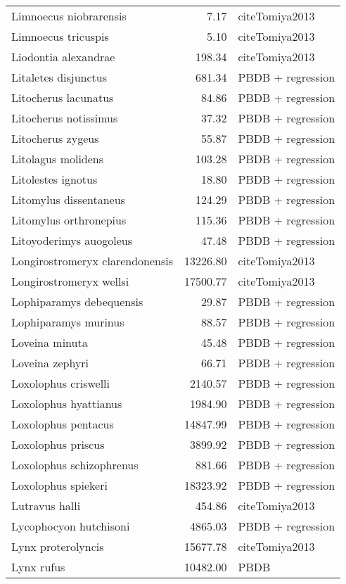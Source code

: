 \begin{table}[ht]
\begin{tabular}{lrl}
  Limnoecus niobrarensis & 7.17 & cite{Tomiya2013} \\ 
  Limnoecus tricuspis & 5.10 & cite{Tomiya2013} \\ 
  Liodontia alexandrae & 198.34 & cite{Tomiya2013} \\ 
  Litaletes disjunctus & 681.34 & PBDB + regression \\ 
  Litocherus lacunatus & 84.86 & PBDB + regression \\ 
  Litocherus notissimus & 37.32 & PBDB + regression \\ 
  Litocherus zygeus & 55.87 & PBDB + regression \\ 
  Litolagus molidens & 103.28 & PBDB + regression \\ 
  Litolestes ignotus & 18.80 & PBDB + regression \\ 
  Litomylus dissentaneus & 124.29 & PBDB + regression \\ 
  Litomylus orthronepius & 115.36 & PBDB + regression \\ 
  Litoyoderimys auogoleus & 47.48 & PBDB + regression \\ 
  Longirostromeryx clarendonensis & 13226.80 & cite{Tomiya2013} \\ 
  Longirostromeryx wellsi & 17500.77 & cite{Tomiya2013} \\ 
  Lophiparamys debequensis & 29.87 & PBDB + regression \\ 
  Lophiparamys murinus & 88.57 & PBDB + regression \\ 
  Loveina minuta & 45.48 & PBDB + regression \\ 
  Loveina zephyri & 66.71 & PBDB + regression \\ 
  Loxolophus criswelli & 2140.57 & PBDB + regression \\ 
  Loxolophus hyattianus & 1984.90 & PBDB + regression \\ 
  Loxolophus pentacus & 14847.99 & PBDB + regression \\ 
  Loxolophus priscus & 3899.92 & PBDB + regression \\ 
  Loxolophus schizophrenus & 881.66 & PBDB + regression \\ 
  Loxolophus spiekeri & 18323.92 & PBDB + regression \\ 
  Lutravus halli & 454.86 & cite{Tomiya2013} \\ 
  Lycophocyon hutchisoni & 4865.03 & PBDB + regression \\ 
  Lynx proterolyncis & 15677.78 & cite{Tomiya2013} \\ 
  Lynx rufus & 10482.00 & PBDB \\ 

\end{tabular}
\end{table}
